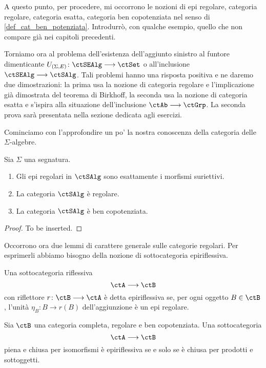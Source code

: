 \begin{warning}\label{caveat_reg_ex}
A questo punto, per procedere, mi occorrono le nozioni di epi regolare, categoria regolare, categoria esatta, categoria
ben copotenziata nel senso di \ref{def_cat_ben_potenziata}. Introdurrò, con qualche esempio, quello che non compare già 
nei capitoli precedenti.
\end{warning} 

Torniamo ora al problema dell'esistenza dell'aggiunto sinistro al funtore dimenticante $U_{(\Sigma,E)} \colon \ctSEAlg \fun \ctSet$
o all'inclusione $\ctSEAlg \fun \ctSAlg$. Tali problemi hanno una risposta positiva e ne daremo due dimostrazioni: la prima usa la 
nozione di categoria regolare e l'implicazione già dimostrata del teorema di Birkhoff, la seconda usa la nozione di categoria esatta e
s'ispira alla situazione dell'inclusione $\ctAb \fun \ctGrp$. La seconda prova sarà presentata nella sezione dedicata agli esercizi. 

Cominciamo con l'approfondire un po' la nostra conoscenza della categoria delle $\Sigma$-algebre.

\begin{proposition}\label{prop_alg_reg}
Sia $\Sigma$ una segnatura.
\begin{enumerate}
\item Gli epi regolari in $\ctSAlg$ sono esattamente i morfismi suriettivi.
\item La categoria $\ctSAlg$ è regolare.
\item La categoria $\ctSAlg$ è ben copotenziata.
\end{enumerate}
\end{proposition}

\begin{proof}
To be inserted.
\end{proof}

Occorrono ora due lemmi di carattere generale sulle categorie regolari. Per esprimerli abbiamo bisogno della nozione di
sottocategoria epiriflessiva.

\begin{definition}\label{def_sottocat_epirifl}
Una sottocategoria riflessiva
\[
  \ctA \fun \ctB 
\]
con riflettore $r \colon \ctB \fun \ctA$ è detta epiriflessiva se, per ogni oggetto $B \in \ctB$, l'unità $\eta_B \colon B \to r(B)$
dell'aggiunzione è un epi regolare.
\end{definition} 

\begin{lemma}\label{lemma_caract_epirifl}
Sia $\ctB$ una categoria completa, regolare e ben copotenziata. Una sottocategoria
\[
  \ctA \fun \ctB 
\]
piena e chiusa per isomorfismi è epiriflessiva se e solo se è chiusa per prodotti e sottoggetti.
\end{lemma}

